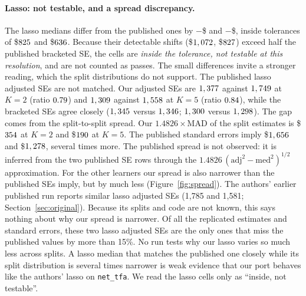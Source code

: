\documentclass[11pt]{article}
\def\absvalaux-#1\relax{#1}
\newcommand{\absval}[1]{\expandafter\absvalaux#1\relax}
\newcommand{\negusd}[1]{$-$\$\absval{#1}}
\newcommand{\var}[1]{\texttt{#1}}
\begin{document}
\paragraph{Lasso: not testable, and a spread discrepancy.} The lasso medians differ from
the published ones by \negusd{\DiffLassoTwo} and \negusd{\DiffLassoFive}, inside
tolerances of \$$825$ and \$$636$. Because their detectable shifts
(\$$1,072$, \$$827$) exceed half the published bracketed SE, the cells
are \emph{inside the tolerance, not testable at this resolution}, and are not counted
as passes. The small differences invite a stronger reading, which the split
distributions do not support. The published lasso adjusted SEs are not matched. Our
adjusted SEs are $1,377$ against $1,749$ at $K = 2$ (ratio
$0.79$) and $1,309$ against $1,558$ at $K = 5$
(ratio $0.84$), while the bracketed SEs agree closely ($1,345$
versus $1,346$; $1,300$ versus $1,298$). The gap comes
from the split-to-split spread. Our $1.4826 \times \text{MAD}$ of the split estimates is
\$$354$ at $K = 2$ and \$$190$ at $K = 5$. The published
standard errors imply \$$1,656$ and \$$1,278$, several
times more. The published spread is not observed: it is inferred from the two
published SE rows through the $1.4826\,(\text{adj}^2 - \text{med}^2)^{1/2}$
approximation. For the other learners our spread is also narrower than the published
SEs imply, but by much less (Figure~\ref{fig:spread}). The authors' earlier published run
reports similar lasso adjusted SEs (1,785 and 1,581; Section~\ref{sec:original}). Because
its splits and code are not known, this says nothing about why our spread is narrower.
Of all the replicated estimates and standard
errors, these two lasso adjusted SEs are the only ones that miss the published values by
more than 15\%. No run tests why our lasso varies so much less across splits. A lasso
median that matches the published one closely while its split distribution is several
times narrower is weak evidence that our port behaves like the authors' lasso on
\var{net\_tfa}. We read the lasso cells only as ``inside, not testable''.
\end{document}
